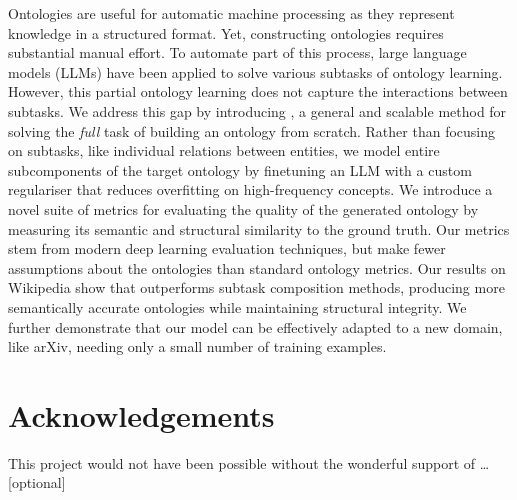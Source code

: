Ontologies are useful for automatic machine processing as they represent knowledge in a structured format. Yet, constructing ontologies requires substantial manual effort. To automate part of this process, large language models (LLMs) have been applied to solve various subtasks of ontology learning. However, this partial ontology learning does not capture the interactions between subtasks.
We address this gap by introducing \name, a general and scalable method for solving the \emph{full} task of building an ontology from scratch.
Rather than focusing on subtasks, like individual relations between entities, we model entire subcomponents of the target ontology by finetuning an LLM with a custom regulariser that reduces overfitting on high-frequency concepts. We introduce a novel suite of metrics for evaluating the quality of the generated ontology by measuring its semantic and structural similarity to the ground truth. Our metrics stem from modern deep learning evaluation techniques, but make fewer assumptions about the ontologies than standard ontology metrics.
Our results on Wikipedia show that \name outperforms subtask composition methods, producing more semantically accurate ontologies while maintaining structural integrity. We further demonstrate that our model can be effectively adapted to a new domain, like arXiv, needing only a small number of training examples.

\ifsubmission\else

    \chapter*{Acknowledgements}

    This project would not have been possible without the wonderful
    support of \ldots [optional]

\fi
\cleardoublepage %